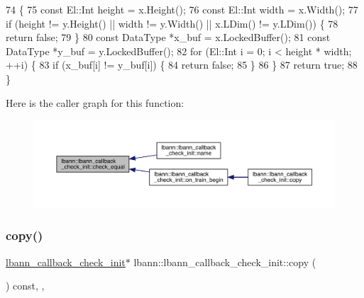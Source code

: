\begin{DoxyCode}
74                                                                             \{
75   \textcolor{keyword}{const} El::Int height = x.Height();
76   \textcolor{keyword}{const} El::Int width = x.Width();
77   \textcolor{keywordflow}{if} (height != y.Height() || width != y.Width() || x.LDim() != y.LDim()) \{
78     \textcolor{keywordflow}{return} \textcolor{keyword}{false};
79   \}
80   \textcolor{keyword}{const} DataType *x\_buf = x.LockedBuffer();
81   \textcolor{keyword}{const} DataType *y\_buf = y.LockedBuffer();
82   \textcolor{keywordflow}{for} (El::Int i = 0; i < height * width; ++i) \{
83     \textcolor{keywordflow}{if} (x\_buf[i] != y\_buf[i]) \{
84       \textcolor{keywordflow}{return} \textcolor{keyword}{false};
85     \}
86   \}
87   \textcolor{keywordflow}{return} \textcolor{keyword}{true};
88 \}
\end{DoxyCode}
Here is the caller graph for this function\+:\nopagebreak
\begin{figure}[H]
\begin{center}
\leavevmode
\includegraphics[width=350pt]{classlbann_1_1lbann__callback__check__init_a9a7a7cffe24967aae2b82d1668c2b87c_icgraph}
\end{center}
\end{figure}
\mbox{\label{classlbann_1_1lbann__callback__check__init_aa210192427df3f6aa7e12509e9b57f56}} 
\subsubsection{\texorpdfstring{copy()}{copy()}}
{\footnotesize\ttfamily \hyperlink{classlbann_1_1lbann__callback__check__init}{lbann\+\_\+callback\+\_\+check\+\_\+init}$\ast$ lbann\+::lbann\+\_\+callback\+\_\+check\+\_\+init\+::copy (\begin{DoxyParamCaption}{ }\end{DoxyParamCaption}) const\hspace{0.3cm}{\ttfamily [inline]}, {\ttfamily [override]}, {\ttfamily [virtual]}}



